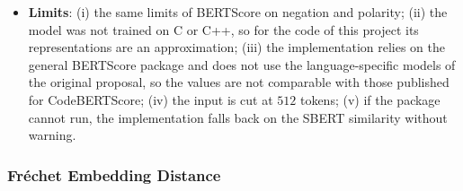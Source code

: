 \begin{itemize}[leftmargin=*, label=\textbullet]
	\item \textbf{Limits}: (i) the same limits of BERTScore on negation and polarity; (ii) the model
	was not trained on C or C++, so for the code of this project its representations are an
	approximation; (iii) the implementation relies on the general BERTScore package and does not use
	the language-specific models of the original proposal, so the values are not comparable with
	those published for CodeBERTScore; (iv) the input is cut at $512$ tokens; (v) if the package
	cannot run, the implementation falls back on the SBERT similarity without warning.
\end{itemize}

\subsubsection{Fr\'echet Embedding Distance}
\label{subsubsec:frechet}
